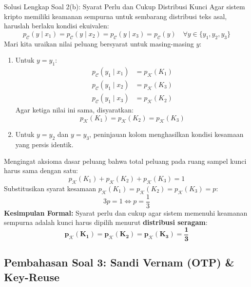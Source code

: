 \documentclass[11pt,a4paper]{article}
\begin{document}
\vspace{0.3cm}

\begin{solusibox}{Solusi Lengkap Soal 2(b): Syarat Perlu dan Cukup Distribusi Kunci}
Agar sistem kripto memiliki keamanan sempurna untuk sembarang distribusi teks asal, haruslah berlaku kondisi ekuivalen:
\[
p_{\mathcal{C}}(y \mid x_1) = p_{\mathcal{C}}(y \mid x_2) = p_{\mathcal{C}}(y \mid x_3) = p_{\mathcal{C}}(y) \quad \forall y \in \{y_1, y_2, y_3\}
\]
Mari kita uraikan nilai peluang bersyarat untuk masing-masing $y$:
\begin{enumerate}
    \item Untuk $y = y_1$:
    \begin{align*}
    p_{\mathcal{C}}(y_1 \mid x_1) &= p_{\mathcal{K}}(K_1) \\
    p_{\mathcal{C}}(y_1 \mid x_2) &= p_{\mathcal{K}}(K_3) \\
    p_{\mathcal{C}}(y_1 \mid x_3) &= p_{\mathcal{K}}(K_2)
    \end{align*}
    Agar ketiga nilai ini sama, disyaratkan:
    \[
    p_{\mathcal{K}}(K_1) = p_{\mathcal{K}}(K_2) = p_{\mathcal{K}}(K_3)
    \]
    \item Untuk $y = y_2$ dan $y = y_3$, peninjauan kolom menghasilkan kondisi kesamaan yang persis identik.
\end{enumerate}
Mengingat aksioma dasar peluang bahwa total peluang pada ruang sampel kunci harus sama dengan satu:
\[
p_{\mathcal{K}}(K_1) + p_{\mathcal{K}}(K_2) + p_{\mathcal{K}}(K_3) = 1
\]
Substitusikan syarat kesamaan $p_{\mathcal{K}}(K_1) = p_{\mathcal{K}}(K_2) = p_{\mathcal{K}}(K_3) = p$:
\[
3p = 1 \iff p = \frac{1}{3}
\]
\textbf{Kesimpulan Formal:} Syarat perlu dan cukup agar sistem memenuhi keamanan sempurna adalah kunci harus dipilih menurut \textbf{distribusi seragam}:
\[
\mathbf{p_{\mathcal{K}}(K_1) = p_{\mathcal{K}}(K_2) = p_{\mathcal{K}}(K_3) = \frac{1}{3}}
\]
\end{solusibox}

\newpage

\subsection{Pembahasan Soal 3: Sandi Vernam (OTP) \& Key-Reuse}
\end{document}
